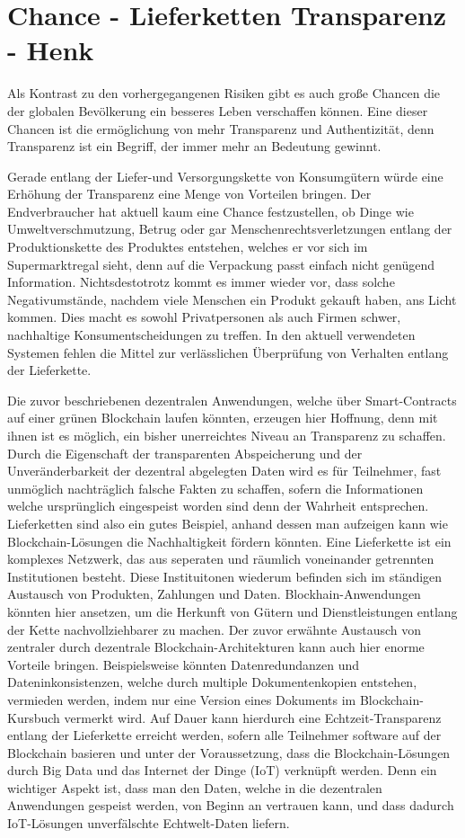 \section{Chance - Lieferketten Transparenz - Henk}

Als Kontrast zu den vorhergegangenen Risiken gibt es auch große Chancen die der globalen Bevölkerung ein besseres Leben verschaffen können. Eine dieser Chancen ist die ermöglichung von mehr Transparenz und Authentizität, denn Transparenz ist ein Begriff, der immer mehr an Bedeutung gewinnt.

 Gerade entlang der Liefer-und Versorgungskette von Konsumgütern würde eine Erhöhung der Transparenz eine Menge von Vorteilen bringen. Der Endverbraucher hat aktuell kaum eine Chance festzustellen, ob Dinge wie Umweltverschmutzung, Betrug oder gar Menschenrechtsverletzungen entlang der Produktionskette des Produktes entstehen, welches er vor sich im Supermarktregal sieht, denn auf die Verpackung passt einfach nicht genügend Information. Nichtsdestotrotz kommt es immer wieder vor, dass solche Negativumstände, nachdem viele Menschen ein Produkt gekauft haben, ans Licht kommen. Dies macht es sowohl Privatpersonen als auch Firmen schwer, nachhaltige Konsumentscheidungen zu treffen. In den aktuell verwendeten Systemen fehlen die Mittel zur verlässlichen Überprüfung von Verhalten entlang der Lieferkette\cite{lieferketteVerbraucherZentrale}.
 
  Die zuvor beschriebenen dezentralen Anwendungen, welche über Smart-Contracts auf einer grünen Blockchain laufen könnten, erzeugen hier Hoffnung, denn mit ihnen ist es möglich, ein bisher unerreichtes Niveau an Transparenz zu schaffen. Durch die Eigenschaft der transparenten Abspeicherung und der Unveränderbarkeit der dezentral abgelegten Daten wird es für Teilnehmer, fast unmöglich nachträglich falsche Fakten zu schaffen, sofern die Informationen welche ursprünglich eingespeist worden sind denn der Wahrheit entsprechen. Lieferketten sind also ein gutes Beispiel, anhand dessen man aufzeigen kann wie Blockchain-Lösungen die Nachhaltigkeit fördern könnten.\cite{supplyChainPaper} Eine Lieferkette ist ein komplexes Netzwerk, das aus seperaten und räumlich voneinander getrennten Institutionen besteht. Diese Instituitonen wiederum befinden sich im ständigen Austausch von Produkten, Zahlungen und Daten. Blockhain-Anwendungen könnten hier ansetzen, um die Herkunft von Gütern und Dienstleistungen entlang der Kette nachvollziehbarer zu machen. Der zuvor erwähnte Austausch von zentraler durch dezentrale Blockchain-Architekturen kann auch hier enorme Vorteile bringen. Beispielsweise könnten Datenredundanzen und Dateninkonsistenzen, welche durch multiple Dokumentenkopien entstehen, vermieden werden, indem nur eine Version eines Dokuments im Blockchain-Kursbuch vermerkt wird. \clearpage Auf Dauer kann hierdurch eine Echtzeit-Transparenz entlang der Lieferkette erreicht werden, sofern alle Teilnehmer software auf der Blockchain basieren und unter der Voraussetzung, dass die Blockchain-Lösungen durch Big Data und das Internet der Dinge (IoT) verknüpft werden. Denn ein wichtiger Aspekt ist, dass man den Daten, welche in die dezentralen Anwendungen gespeist werden, von Beginn an vertrauen kann, und dass dadurch IoT-Lösungen unverfälschte Echtwelt-Daten liefern. 
  
